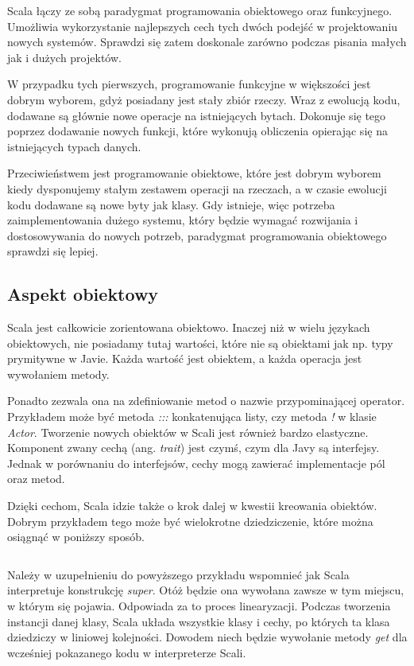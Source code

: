\documentclass[brudnopis]{xmgr}
\begin{document}
Scala łączy ze sobą paradygmat programowania obiektowego oraz funkcyjnego. Umożliwia wykorzystanie najlepszych cech tych dwóch podejść w projektowaniu nowych systemów. Sprawdzi się zatem doskonale zarówno podczas pisania małych jak i dużych projektów.

W przypadku tych pierwszych, programowanie funkcyjne w większości jest dobrym wyborem, gdyż posiadany jest stały zbiór rzeczy. Wraz z ewolucją kodu, dodawane są głównie nowe operacje na istniejących bytach. Dokonuje się tego poprzez dodawanie nowych funkcji, które wykonują obliczenia opierając się na istniejących typach danych. 

Przeciwieństwem jest programowanie obiektowe, które jest dobrym wyborem kiedy dysponujemy stałym zestawem operacji na rzeczach, a w czasie ewolucji kodu dodawane są nowe byty jak klasy. Gdy istnieje, więc potrzeba zaimplementowania dużego systemu, który będzie wymagać rozwijania i dostosowywania do nowych potrzeb, paradygmat programowania obiektowego sprawdzi się lepiej.

\subsection{Aspekt obiektowy}

Scala jest całkowicie zorientowana obiektowo. Inaczej niż w wielu językach obiektowych, nie posiadamy tutaj wartości, które nie są obiektami jak np. typy prymitywne w Javie. Każda wartość jest obiektem, a każda operacja jest wywołaniem metody. 

Ponadto zezwala ona na zdefiniowanie metod o nazwie przypominającej operator. Przykładem może być metoda \emph{:::} konkatenująca listy, czy metoda \emph{!} w klasie \textit{Actor}. Tworzenie nowych obiektów w Scali jest również bardzo elastyczne. Komponent zwany cechą (ang. \emph{trait}) jest czymś, czym dla Javy są interfejsy. Jednak w porównaniu do interfejsów, cechy mogą zawierać implementacje pól oraz metod. 

Dzięki cechom, Scala idzie także o krok dalej w kwestii kreowania obiektów. Dobrym przykładem tego może być wielokrotne dziedziczenie, które można osiągnąć w poniższy sposób.

\inputminted[fontsize=\small]{scala}{code/multipleInheritance.scala}

Należy w uzupełnieniu do powyższego przykładu wspomnieć jak Scala interpretuje konstrukcję \emph{super}. Otóż będzie ona wywołana zawsze w tym miejscu, w którym się pojawia. Odpowiada za to proces linearyzacji. Podczas tworzenia instancji danej klasy, Scala układa wszystkie klasy i cechy, po których ta klasa dziedziczy w liniowej kolejności. Dowodem niech będzie wywołanie metody \emph{get} dla wcześniej pokazanego kodu w interpreterze Scali.
\end{document}
